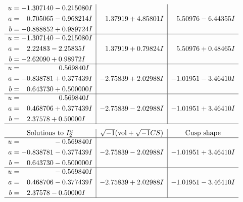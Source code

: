 \documentclass[1p]{elsarticle_modified}
\theoremstyle{definition}
\newcommand{\I}{\sqrt{-1}}
\begin{document}
$$\begin{array}{c|c|c}
\begin{aligned}
u &= -1.307140 - 0.215080 I \\
a &= \phantom{-}0.705065 - 0.968214 I \\
b &= -0.888852 + 0.989724 I\end{aligned}
 & \phantom{-}1.37919 + 4.85801 I & \phantom{-}5.50976 - 6.44355 I \\ \hline\begin{aligned}
u &= -1.307140 - 0.215080 I \\
a &= \phantom{-}2.22483 - 2.25835 I \\
b &= -2.62090 + 0.98972 I\end{aligned}
 & \phantom{-}1.37919 + 0.79824 I & \phantom{-}5.50976 + 0.48465 I \\ \hline\begin{aligned}
u &= \phantom{-0.000000 -}0.569840 I \\
a &= -0.838781 + 0.377439 I \\
b &= \phantom{-}0.643730 + 0.500000 I\end{aligned}
 & -2.75839 + 2.02988 I & -1.01951 - 3.46410 I \\ \hline\begin{aligned}
u &= \phantom{-0.000000 -}0.569840 I \\
a &= \phantom{-}0.468706 + 0.377439 I \\
b &= \phantom{-}2.37578 + 0.50000 I\end{aligned}
 & -2.75839 - 2.02988 I & -1.01951 + 3.46410 I\\
 \hline 
 \end{array}$$\newpage$$\begin{array}{c|c|c}  
\text{Solutions to }I^u_{2}& \I (\text{vol} + \sqrt{-1}CS) & \text{Cusp shape}\\
 \hline 
\begin{aligned}
u &= \phantom{-0.000000 } -0.569840 I \\
a &= -0.838781 - 0.377439 I \\
b &= \phantom{-}0.643730 - 0.500000 I\end{aligned}
 & -2.75839 - 2.02988 I & -1.01951 + 3.46410 I \\ \hline\begin{aligned}
u &= \phantom{-0.000000 } -0.569840 I \\
a &= \phantom{-}0.468706 - 0.377439 I \\
b &= \phantom{-}2.37578 - 0.50000 I\end{aligned}
 & -2.75839 + 2.02988 I & -1.01951 - 3.46410 I\\
 \hline 
 \end{array}$$\newpage
\end{document}
